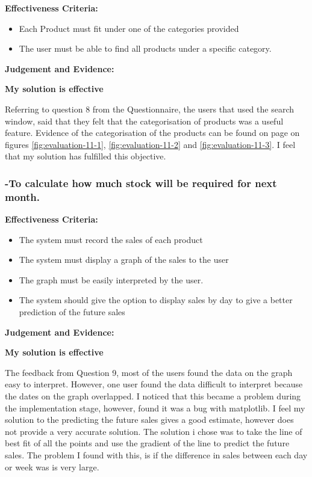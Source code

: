 \textbf{Effectiveness Criteria:}\newline
\begin{itemize}
	\item{Each Product must fit under one of the categories provided}
	\item{The user must be able to find all products under a specific category.}
\end{itemize}
\textbf{Judgement and Evidence:} \newline

\textbf{\large{My solution is effective}}

Referring to question 8 from the Questionnaire, the users that used the search window, said that they felt that the categorisation of products was a useful feature. Evidence of the categorisation of the products can be found on page \pageref{category-evidence} on figures \ref{fig:evaluation-11-1}, \ref{fig:evaluation-11-2} and \ref{fig:evaluation-11-3}. I feel that my solution has fulfilled this objective. 







\pagebreak
\subsubsection{-To calculate how much stock will be required for next month.}

\textbf{Effectiveness Criteria:}\newline
\begin{itemize}
	\item{The system must record the sales of each product}
	\item{The system must display a graph of the sales to the user}
	\item{The graph must be easily interpreted by the user.}
	\item{The system should give the option to display sales by day to give a better prediction of the future sales}
\end{itemize}

\textbf{Judgement and Evidence:} \newline

\textbf{\large{My solution is effective}}

The feedback from Question 9, most of the users found the data on the graph easy to interpret. However, one user found the data difficult to interpret because the dates on the graph overlapped. I noticed that this became a problem during the implementation stage, however, found it was a bug with matplotlib. I feel my solution to the predicting the future sales gives a good estimate, however does not provide a very accurate solution. The solution i chose was to take the line of best fit of all the points and use the gradient of the line to predict the future sales. The problem I found with this, is if the difference in sales between each day or week was is very large.







